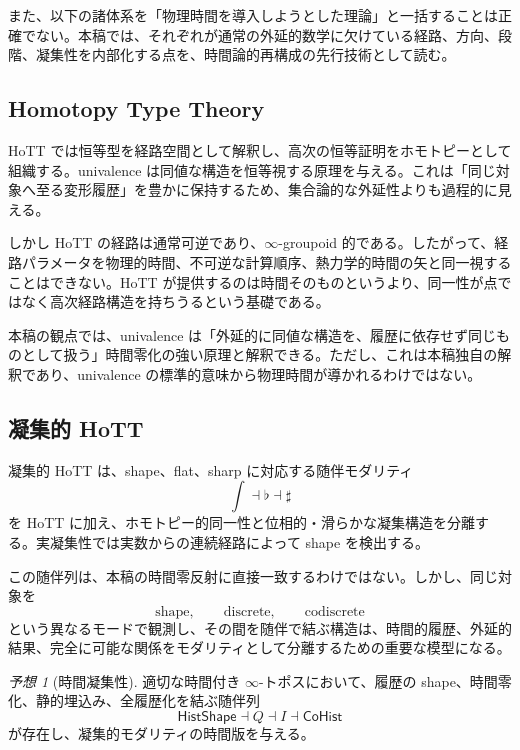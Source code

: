 \documentclass[a4paper,11pt]{ltjsarticle}
\theoremstyle{remark}
\newtheorem{conjecture}[definition]{予想}
\begin{document}
また、以下の諸体系を「物理時間を導入しようとした理論」と一括することは正確でない。本稿では、それぞれが通常の外延的数学に欠けている経路、方向、段階、凝集性を内部化する点を、時間論的再構成の先行技術として読む。

\subsection{Homotopy Type Theory}
HoTT では恒等型を経路空間として解釈し、高次の恒等証明をホモトピーとして組織する。univalence は同値な構造を恒等視する原理を与える\cite{HoTT2013}。これは「同じ対象へ至る変形履歴」を豊かに保持するため、集合論的な外延性よりも過程的に見える。

しかし HoTT の経路は通常可逆であり、$\infty$-groupoid 的である。したがって、経路パラメータを物理的時間、不可逆な計算順序、熱力学的時間の矢と同一視することはできない。HoTT が提供するのは時間そのものというより、同一性が点ではなく高次経路構造を持ちうるという基礎である。

本稿の観点では、univalence は「外延的に同値な構造を、履歴に依存せず同じものとして扱う」時間零化の強い原理と解釈できる。ただし、これは本稿独自の解釈であり、univalence の標準的意味から物理時間が導かれるわけではない。

\subsection{凝集的 HoTT}
凝集的 HoTT は、shape、flat、sharp に対応する随伴モダリティ
\begin{equation}
 \int\dashv\flat\dashv\sharp
 \label{eq:cohesive-modalities}
\end{equation}
を HoTT に加え、ホモトピー的同一性と位相的・滑らかな凝集構造を分離する\cite{SchreiberShulman2014,Shulman2015}。実凝集性では実数からの連続経路によって shape を検出する。

この随伴列は、本稿の時間零反射に直接一致するわけではない。しかし、同じ対象を
\begin{equation}
 \text{shape},\qquad
 \text{discrete},\qquad
 \text{codiscrete}
\end{equation}
という異なるモードで観測し、その間を随伴で結ぶ構造は、時間的履歴、外延的結果、完全に可能な関係をモダリティとして分離するための重要な模型になる。

\begin{conjecture}[時間凝集性]
適切な時間付き $\infty$-トポスにおいて、履歴の shape、時間零化、静的埋込み、全履歴化を結ぶ随伴列
\begin{equation}
 \mathsf{HistShape}\dashv Q\dashv I\dashv\mathsf{CoHist}
 \end{equation}
が存在し、凝集的モダリティの時間版を与える。
\end{conjecture}
\end{document}
